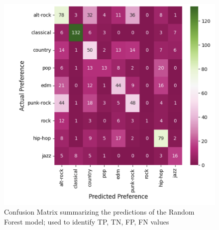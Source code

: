 \documentclass[times, twocolumn]{article}
\begin{document}
\begin{figure}[H]
    \centering
    \includegraphics[width=1.0\linewidth]{RFconf_mat.png}
    \caption{Confusion Matrix summarizing the predictions of the Random Forest model; used to identify TP, TN, FP, FN values}
    \label{rf_confmatrix}
\end{figure}
\end{document}
